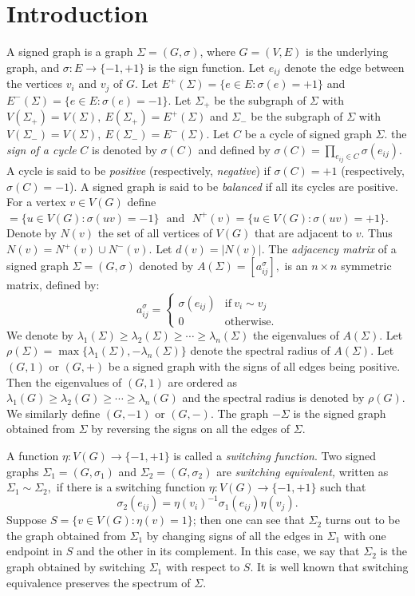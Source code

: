 \documentclass[12pt]{article}
\theoremstyle{plain}
\numberwithin{equation}{section}
\begin{document}
	\section{Introduction}
	A signed graph is a graph $\Sigma=(G,\sigma)$, where $G=(V, E)$ is the underlying graph, and $\sigma: E\rightarrow \{-1, +1\}$ is the sign function. Let $e_{ij}$ denote the edge between the vertices $v_{i}$ and $v_{j}$ of $G.$ Let $E^+(\Sigma)=\{e \in E: \sigma(e)=+1\}$ and $E^-(\Sigma)=\{e \in E: \sigma(e)=-1\}$. Let $\Sigma_+$ be the subgraph of $\Sigma$ with $V(\Sigma_+)=V(\Sigma),~ E(\Sigma_+)=E^+(\Sigma)$ and $\Sigma_-$ be the subgraph of $\Sigma$ with $V(\Sigma_-)=V(\Sigma),~ E(\Sigma_-)=E^-(\Sigma)$. Let $C$ be a cycle of signed graph $\Sigma$. the \emph{sign of a cycle} $C$ is denoted by $\sigma(C)$ and defined by $\sigma(C)=\prod_{e_{ij}\in C}\sigma(e_{ij}).$  A cycle is said to be \emph{positive} (respectively, \emph{negative}) if $\sigma(C)=+1$ (respectively, $\sigma(C)=-1$). A signed graph is said to be \emph{balanced} if all its cycles are positive. For a vertex $v \in V(G)$ define $=\{u\in V(G):\sigma(uv)=-1\} ~~~\mbox{and}~~~ N^{+}(v)=\{u\in V(G):\sigma(uv)=+1\}$. Denote by $N(v)$ the set of all vertices of $V(G)$ that are adjacent to $v$. Thus $N(v) = N^{+}(v) \cup N^{-}(v)$. Let $d(v) = \vert N(v) \vert$.
	The \emph{adjacency matrix} of a signed graph $\Sigma=(G,\sigma)$ denoted by  $A(\Sigma)=[a_{ij}^{\sigma}],$ is an $n \times n$ symmetric matrix, defined by:
	\[a_{ij}^{\sigma}=\begin{cases} 
		\sigma(e_{ij})  & \mbox{if}~ v_{i}\sim v_{j} \\
		0  & \mbox{otherwise}. 
	\end{cases}\]
	We denote by $\lambda_{1}(\Sigma)\geq\lambda_{2}(\Sigma)\geq \cdots\geq \lambda_{n}(\Sigma)$ the eigenvalues of $A(\Sigma)$. Let $\rho(\Sigma)=\max\{\lambda_{1}(\Sigma), -\lambda_{n}(\Sigma)\}$ denote the spectral radius of $A(\Sigma)$. Let $(G,1)$ or $(G,+)$ be a signed graph with the signs of all edges being positive. Then the eigenvalues of $(G,1)$ are ordered as $\lambda_{1}(G)\geq\lambda_{2}(G)\geq \cdots\geq \lambda_{n}(G)$ and the spectral radius is denoted by $\rho(G)$. We similarly define $(G,-1)$ or $(G,-)$. The graph $-\Sigma$ is the signed graph obtained from $\Sigma$ by reversing the signs on all the edges of $\Sigma$.
	
	A function $\eta: V(G)\rightarrow \{-1, +1\}$ is called a \emph{switching function}. Two signed graphs $\Sigma_{1}=(G, \sigma_{1})$ and $\Sigma_{2}=(G, \sigma_{2})$ are \emph{switching equivalent,} written as $\Sigma_{1}\sim \Sigma_{2},$ if there is a switching function $\eta: V(G)\rightarrow \{-1, +1\}$ such that \[\sigma_{2}(e_{ij})=\eta(v_{i})^{-1} \sigma_{1}(e_{ij})\eta(v_{j}).\]
	Suppose $S=\{v\in V(G): \eta(v)=1\}$; then one can see that $\Sigma_2$ turns out to be the graph obtained from $\Sigma_1$ by changing signs of all the edges in $\Sigma_1$ with one endpoint in $S$ and the other in its complement. In this case, we say that $\Sigma_2$ is the graph obtained by switching $\Sigma_1$ with respect to $S$. It is well known that switching equivalence preserves the spectrum of $\Sigma$. 
	
\end{document}
